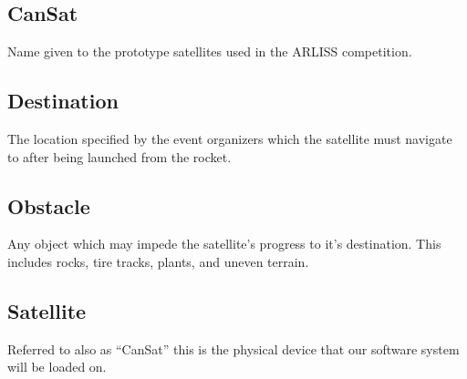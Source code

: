 \documentclass{scrreprt}
\begin{document}
\subsection{CanSat}
Name given to the prototype satellites used in the ARLISS competition. 

\subsection{Destination}
The location specified by the event organizers which the satellite must navigate to after being launched from the rocket.

\subsection{Obstacle}
Any object which may impede the satellite's progress to it's destination. This includes rocks, tire tracks, plants, and uneven terrain.

\subsection{Satellite}
Referred to also as ``CanSat'' this is the physical device that our software system will be loaded on.
\end{document}
